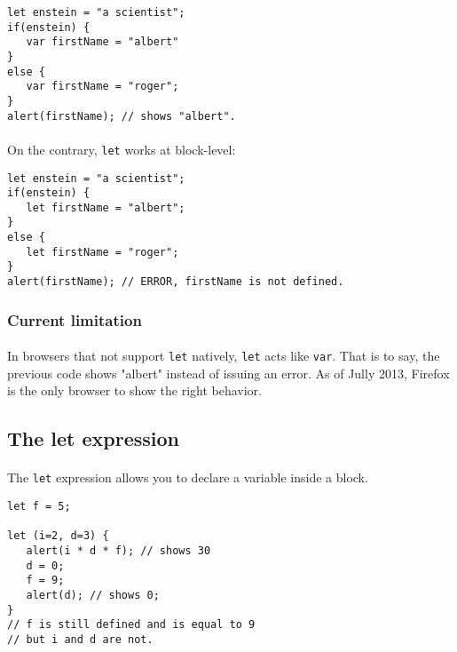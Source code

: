 \documentclass{article}
\begin{document}
\begin{sloppypar}
{\begin{lstlisting}
let enstein = "a scientist";
if(enstein) {
   var firstName = "albert"
}
else {
   var firstName = "roger";
}
alert(firstName); // shows "albert".
\end{lstlisting}
}

 
      
\paragraph{}
On the contrary, \lstinline!let! works at block-level:
{\begin{lstlisting}
let enstein = "a scientist";
if(enstein) {
   let firstName = "albert";
}
else {
   let firstName = "roger";
}
alert(firstName); // ERROR, firstName is not defined.
\end{lstlisting}
}


      

\subsubsection{ Current limitation}


\paragraph{}
In browsers that not support \lstinline!let! natively, \lstinline!let! acts like \lstinline!var!. That is to say, the previous code shows "albert" instead of issuing an error. As of Jully 2013, Firefox is the only browser to show the right behavior.
      
   
   
   

\subsection{ The let expression}


\paragraph{}
The \lstinline!let! expression allows you to declare a variable inside a block.
{\begin{lstlisting}
let f = 5;

let (i=2, d=3) {
   alert(i * d * f); // shows 30
   d = 0;
   f = 9;
   alert(d); // shows 0;
}
// f is still defined and is equal to 9
// but i and d are not.
\end{lstlisting}
}



\end{sloppypar}
\end{document}
